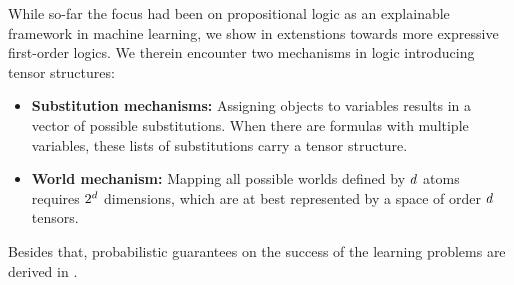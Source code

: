
While so-far the focus had been on propositional logic as an explainable framework in machine learning, we show in  extenstions towards more expressive first-order logics.
We therein encounter two mechanisms in logic introducing tensor structures:
\begin{itemize}
    \item \textbf{Substitution mechanisms:} Assigning objects to variables results in a vector of possible substitutions. When there are formulas with multiple variables, these lists of substitutions carry a tensor structure.
    \item \textbf{World mechanism:} Mapping all possible worlds defined by $d$ atoms requires $2^{d}$ dimensions, which are at best represented by a space of order $d$ tensors.
\end{itemize}


Besides that, probabilistic guarantees on the success of the learning problems are derived in .